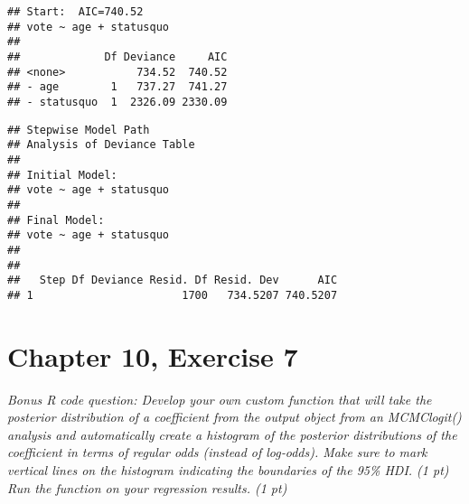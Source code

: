 \documentclass[]{article}
\newenvironment{Shaded}{\begin{snugshade}}{\end{snugshade}}
\newcommand{\CommentTok}[1]{\textcolor[rgb]{0.56,0.35,0.01}{\textit{#1}}}
\newcommand{\NormalTok}[1]{#1}
\newcommand{\OperatorTok}[1]{\textcolor[rgb]{0.81,0.36,0.00}{\textbf{#1}}}
\begin{document}
\begin{verbatim}
## Start:  AIC=740.52
## vote ~ age + statusquo
## 
##             Df Deviance     AIC
## <none>           734.52  740.52
## - age        1   737.27  741.27
## - statusquo  1  2326.09 2330.09
\end{verbatim}

\begin{Shaded}
\end{Shaded}

\begin{verbatim}
## Stepwise Model Path 
## Analysis of Deviance Table
## 
## Initial Model:
## vote ~ age + statusquo
## 
## Final Model:
## vote ~ age + statusquo
## 
## 
##   Step Df Deviance Resid. Df Resid. Dev      AIC
## 1                       1700   734.5207 740.5207
\end{verbatim}

\begin{Shaded}
\end{Shaded}

\hypertarget{chapter-10-exercise-7}{%
\section{Chapter 10, Exercise 7}\label{chapter-10-exercise-7}}

\emph{Bonus R code question: Develop your own custom function that will
take the posterior distribution of a coefficient from the output object
from an MCMClogit() analysis and automatically create a histogram of the
posterior distributions of the coefficient in terms of regular odds
(instead of log‐odds). Make sure to mark vertical lines on the histogram
indicating the boundaries of the 95\% HDI. (1 pt) Run the function on
your regression results. (1 pt)}
\end{document}
